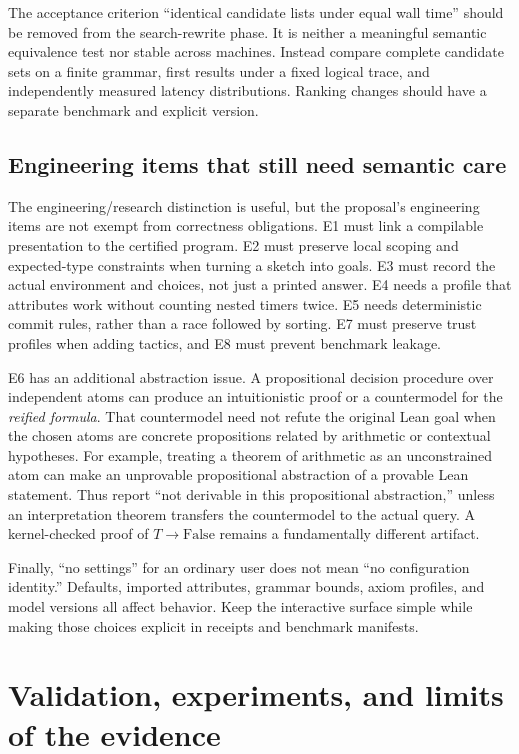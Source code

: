 \documentclass[11pt,a4paper]{article}
\theoremstyle{definition}
\theoremstyle{remark}
\begin{document}
The acceptance criterion ``identical candidate lists under equal wall time''
should be removed from the search-rewrite phase. It is neither a meaningful
semantic equivalence test nor stable across machines. Instead compare complete
candidate sets on a finite grammar, first results under a fixed logical trace,
and independently measured latency distributions. Ranking changes should have
a separate benchmark and explicit version.

\subsection{Engineering items that still need semantic care}
The engineering/research distinction is useful, but the proposal's engineering
items are not exempt from correctness obligations. E1 must link a compilable
presentation to the certified program. E2 must preserve local scoping and
expected-type constraints when turning a sketch into goals. E3 must record the
actual environment and choices, not just a printed answer. E4 needs a profile
that attributes work without counting nested timers twice. E5 needs deterministic
commit rules, rather than a race followed by sorting. E7 must preserve trust
profiles when adding tactics, and E8 must prevent benchmark leakage.

E6 has an additional abstraction issue. A propositional decision procedure over
independent atoms can produce an intuitionistic proof or a countermodel for the
\emph{reified formula}. That countermodel need not refute the original Lean goal
when the chosen atoms are concrete propositions related by arithmetic or
contextual hypotheses. For example, treating a theorem of arithmetic as an
unconstrained atom can make an unprovable propositional abstraction of a
provable Lean statement. Thus report ``not derivable in this propositional
abstraction,'' unless an interpretation theorem transfers the countermodel to
the actual query. A kernel-checked proof of $T\to\mathrm{False}$ remains a
fundamentally different artifact.

Finally, ``no settings'' for an ordinary user does not mean ``no configuration
identity.'' Defaults, imported attributes, grammar bounds, axiom profiles, and
model versions all affect behavior. Keep the interactive surface simple while
making those choices explicit in receipts and benchmark manifests.

\section{Validation, experiments, and limits of the evidence}
\label{sec:validation}
\end{document}
